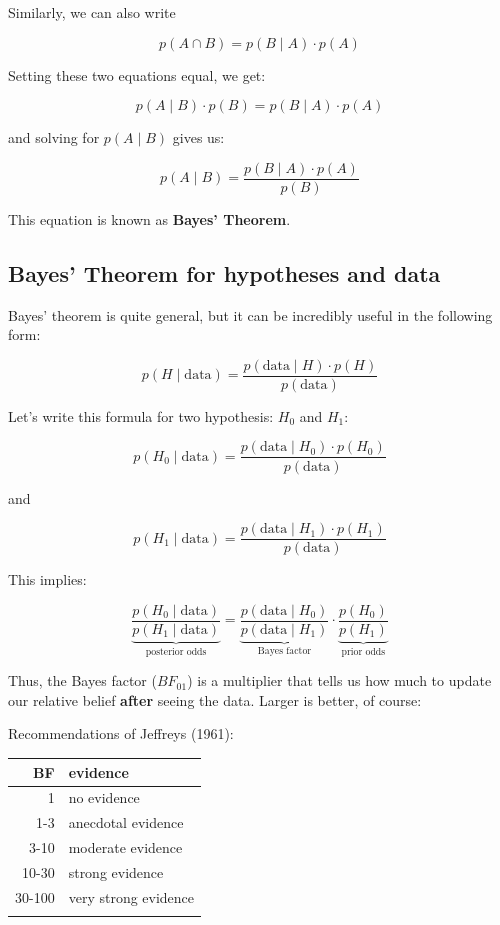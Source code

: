 \documentclass[article,10pt]{article}
\begin{document}
Similarly, we can also write

\[
p(A\cap B) = p(B\mid A)\cdot p(A)
\]

Setting these two equations equal, we get:

\[
p(A\mid B)\cdot p(B) = p(B\mid A)\cdot p(A)
\]

and solving for $p(A\mid B)$ gives us:

\[
p(A\mid B) = \frac{p(B\mid A)\cdot p(A)}{p(B)}
\]

This equation is known as \textbf{Bayes' Theorem}.

\subsection*{Bayes' Theorem for hypotheses and data}
\label{sec-2-2}

Bayes' theorem is quite general, but it can be incredibly useful in the following form:

\[
p(H\mid \text{data}) = \frac{p(\text{data}\mid H)\cdot p(H)}{p(\text{data})}
\]

Let's write this formula for two hypothesis: $H_0$ and $H_1$:

\[
p(H_0\mid \text{data}) = \frac{p(\text{data}\mid H_0)\cdot p(H_0)}{p(\text{data})}
\]

and

\[
p(H_1\mid \text{data}) = \frac{p(\text{data}\mid H_1)\cdot p(H_1)}{p(\text{data})}
\]

This implies:

\[
\underbrace{\frac{p(H_0 \mid \text{data})}{p(H_1\mid\text{data})}}_{\text{posterior odds}} = \underbrace{\frac{p(\text{data}\mid H_0)}{p(\text{data}\mid H_1)}}_{\text{Bayes factor}} \cdot \underbrace{\frac{p(H_0)}{p(H_1)}}_{\text{prior odds}}
\]

Thus, the Bayes factor ($BF_{01}$) is a multiplier that tells us how much to update our relative belief \textbf{after} seeing the data.  Larger is better, of course:

Recommendations of Jeffreys (1961):

\begin{center}
\begin{tabular}{rl}
BF & evidence\\
\hline
1 & no evidence\\
1-3 & anecdotal evidence\\
3-10 & moderate evidence\\
10-30 & strong evidence\\
30-100 & very strong evidence\\
 & \\
\end{tabular}
\end{center}
\end{document}
